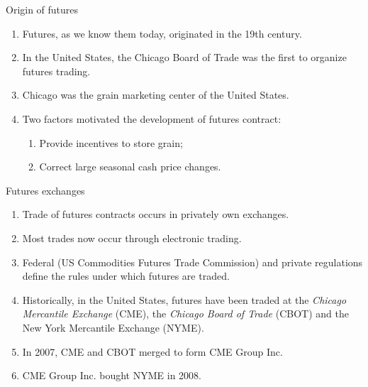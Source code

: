 \documentclass[table,xcolor=pdftex,dvipsnames]{beamer}\usepackage[]{graphicx}\usepackage[]{color}
\begin{document}

\begin{frame}{Origin of futures}
\begin{enumerate}[label=\textbullet]
  \item Futures, as we know them today, originated in the 19th century.
  \item In the United States, the Chicago Board of Trade was the first to organize futures trading.
  \item Chicago was the grain marketing center of the United States.
  \item Two factors motivated the development of futures contract:
     \begin{enumerate}[label=\roman{*})]
          \item Provide incentives to store grain;
          \item Correct large seasonal cash price changes.
      \end{enumerate}
\end{enumerate}
\end{frame}



\begin{frame}{Futures exchanges}
\begin{enumerate}[label=\textbullet]
    \item Trade of futures contracts occurs in privately own exchanges.
    \item Most trades now occur through electronic trading.
    \item Federal (US Commodities Futures Trade Commission) and private regulations define the rules under which futures are traded.
    \item Historically, in the United States, futures have been traded at the \emph{Chicago Mercantile Exchange} (CME), the \emph{Chicago Board of Trade} (CBOT) and the New York Mercantile Exchange (NYME).
    \item In 2007, CME and CBOT merged to form CME Group Inc.
    \item CME Group Inc. bought NYME in 2008.
\end{enumerate}
\end{frame}

\end{document}
